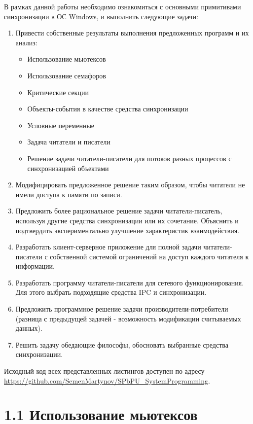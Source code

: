 \documentclass[a4paper,12pt]{article} %
\begin{document}
В рамках данной работы необходимо ознакомиться с основными примитивами синхронизации в ОС Windows, и выполнить следующие задачи:
\begin{enumerate}
\item Привести собственные результаты выполнения предложенных программ и их анализ:
\begin{itemize}
\item Использование мьютексов
\item Использование семафоров
\item Критические секции
\item Объекты-события в качестве средства синхронизации
\item Условные переменные
\item Задача читатели и писатели
\item Решение задачи читатели-писатели для потоков
разных процессов с синхронизацией объектами
\end{itemize}
\item Модифицировать предложенное решение таким образом, чтобы читатели не имели доступа к памяти по записи.
\item Предложить более рациональное решение задачи читатели-писатель, используя другие средства синхронизации или их сочетание. Объяснить и подтвердить экспериментально улучшение характеристик взаимодействия.
\item Разработать клиент-серверное приложение для полной задачи читатели-писатели с собственной системой ограничений на доступ каждого читателя к информации.
\item Разработать программу читатели-писатели для сетевого функционирования. Для этого выбрать подходящие средства IPC и синхронизации.
\item Предложить программное решение задачи производители-потребители (разница с предыдущей задачей - возможность модификации считываемых данных).
\item Решить задачу обедающие философы, обосновать выбранные средства синхронизации.
\end{enumerate}

\vspace{1em}
Исходный код всех представленных листингов доступен по адресу \\ \url{https://github.com/SemenMartynov/SPbPU_SystemProgramming}.

\setcounter{page}{2}

\newpage
\section*{1.1 Использование мьютексов}
\end{document}
